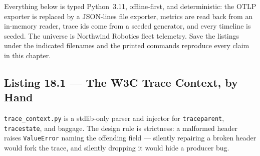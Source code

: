 Everything below is typed Python~3.11, offline-first, and deterministic:
the OTLP exporter is replaced by a JSON-lines file exporter, metrics are
read back from an in-memory reader, trace ids come from a seeded generator,
and every timeline is seeded. The universe is Northwind Robotics fleet
telemetry. Save the listings under the indicated filenames and the printed
commands reproduce every claim in this chapter.

\subsection{Listing 18.1 --- The W3C Trace Context, by Hand}
\label{subsec:ch18-listing-traceparent}

\texttt{trace\_context.py} is a stdlib-only parser and injector for
\texttt{traceparent}, \texttt{tracestate}, and baggage. The design rule is
strictness: a malformed header raises \texttt{ValueError} naming the
offending field --- silently repairing a broken header would fork the
trace, and silently dropping it would hide a producer bug.

